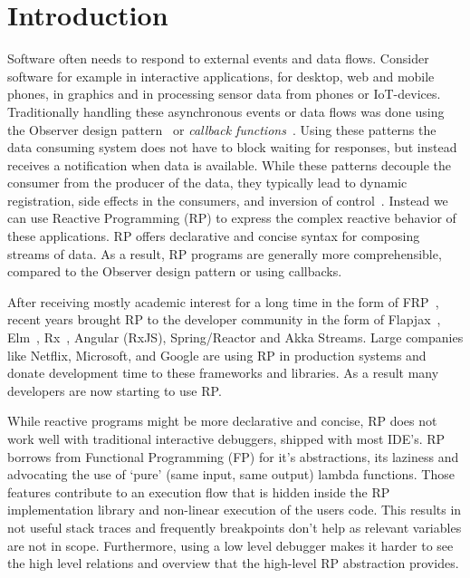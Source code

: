 \section{Introduction}
Software often needs to respond to external events and data flows. Consider software for example in interactive applications, for desktop, web and mobile phones, in graphics and in processing sensor data from phones or IoT-devices. Traditionally handling these asynchronous events or data flows was done using the Observer design pattern~\cite{johnson1995design} or \textit{callback functions}~\cite{gallaba2015don}. Using these patterns the data consuming system does not have to block waiting for responses, but instead receives a notification when data is available. While these patterns decouple the consumer from the producer of the data, they typically lead to dynamic registration, side effects in the consumers, and inversion of control~\cite{salvaneschi2014empirical}. Instead we can use Reactive Programming (RP) to express the complex reactive behavior of these applications. RP offers declarative and concise syntax for composing streams of data. As a result, RP programs are generally more comprehensible, compared to the Observer design pattern or using callbacks.

After receiving mostly academic interest for a long time in the form of FRP~\cite{elliott1997functional,elliott2009push,czaplicki2013asynchronous,maier2010deprecating}, recent years brought RP to the developer community in the form of Flapjax~\cite{meyerovich2009flapjax}, Elm~\cite{czaplicki2012elm}, Rx~\cite{meijer2010subject}, Angular (RxJS), Spring/Reactor and Akka Streams. Large companies like Netflix, Microsoft, and Google are using RP in production systems and donate development time to these frameworks and libraries. As a result many developers are now starting to use RP.

While reactive programs might be more declarative and concise, RP does not work well with traditional interactive debuggers, shipped with most IDE's. RP borrows from Functional Programming (FP) for it's abstractions, its laziness and advocating the use of `pure' (same input, same output) lambda functions. Those features contribute to an execution flow that is hidden inside the RP implementation library and non-linear execution of the users code. This results in not useful stack traces and frequently breakpoints don't help as relevant variables are not in scope. Furthermore, using a low level debugger makes it harder to see the high level relations and overview that the high-level RP abstraction provides.

